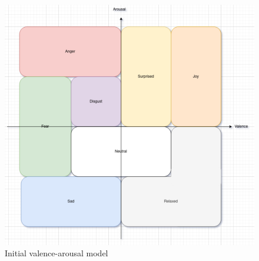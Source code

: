 \begin{figure}[H]
    \centering
    \includegraphics[width=\textwidth]{figures/va16model.png}
    \caption{Initial valence-arousal model}
    \label{fig:VAinit}
\end{figure}

